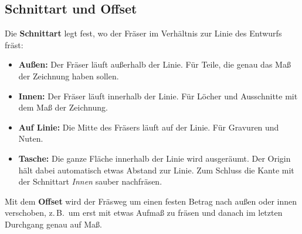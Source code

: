 \documentclass{\basedir/fablab-document}
\begin{document}
	\subsection{Schnittart und Offset}
	Die \textbf{Schnittart} legt fest, wo der Fräser im Verhältnis zur Linie des Entwurfs fräst:

	\begin{center}
		
	\end{center}

	\begin{itemize}
		\item \textbf{Außen:} Der Fräser läuft außerhalb der Linie. Für Teile, die genau das Maß der Zeichnung haben sollen.
		\item \textbf{Innen:} Der Fräser läuft innerhalb der Linie. Für Löcher und Ausschnitte mit dem Maß der Zeichnung.
		\item \textbf{Auf Linie:} Die Mitte des Fräsers läuft auf der Linie. Für Gravuren und Nuten.
		\item \textbf{Tasche:} Die ganze Fläche innerhalb der Linie wird ausgeräumt. Der Origin hält dabei automatisch etwas Abstand zur Linie. Zum Schluss die Kante mit der Schnittart \textit{Innen} sauber nachfräsen.
	\end{itemize}

	Mit dem \textbf{Offset} wird der Fräsweg um einen festen Betrag nach außen oder innen verschoben, z.\,B.\ um erst mit etwas Aufmaß zu fräsen und danach im letzten Durchgang genau auf Maß.
\end{document}
